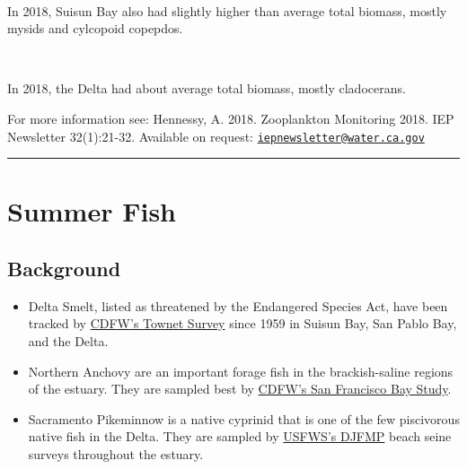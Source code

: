 \documentclass[
]{book}
\providecommand{\tightlist}{%
  \setlength{\itemsep}{0pt}\setlength{\parskip}{0pt}}
\begin{document}
\begin{panel-grid}
\begin{columns-nocenter}
\begin{column40}
~

\end{column40}

\begin{column800}

In 2018, Suisun Bay also had slightly higher than average total biomass, mostly mysids and cylcopoid copepdos.

\end{column800}

\begin{column40}

~

\end{column40}

\begin{column800}

In 2018, the Delta had about average total biomass, mostly cladocerans.

\end{column800}

\end{columns-nocenter}

\end{panel-grid}

\begin{disclaimer}
For more information see: Hennessy, A. 2018. Zooplankton Monitoring
2018. IEP Newsletter 32(1):21-32. Available on request:
\href{mailto:iepnewsletter@water.ca.gov}{\nolinkurl{iepnewsletter@water.ca.gov}}
\end{disclaimer}

\begin{center}\rule{0.5\linewidth}{0.5pt}\end{center}

\hypertarget{summer-fish}{%
\section{Summer Fish}\label{summer-fish}}

\hypertarget{background-4}{%
\subsection{Background}\label{background-4}}

\begin{itemize}
\tightlist
\item
  Delta Smelt, listed as threatened by the Endangered Species Act, have been tracked by \href{https://wildlife.ca.gov/Conservation/Delta/Townet-Survey}{CDFW's Townet Survey} since 1959 in Suisun Bay, San Pablo Bay, and the Delta.
\item
  Northern Anchovy are an important forage fish in the brackish-saline regions of the estuary. They are sampled best by \href{https://wildlife.ca.gov/Conservation/Delta/Bay-Study}{CDFW's San Francisco Bay Study}.
\item
  Sacramento Pikeminnow is a native cyprinid that is one of the few piscivorous native fish in the Delta. They are sampled by \href{https://www.fws.gov/lodi/juvenile_fish_monitoring_program/jfmp_index.htm}{USFWS's DJFMP} beach seine surveys throughout the estuary.
\end{itemize}
\end{document}
